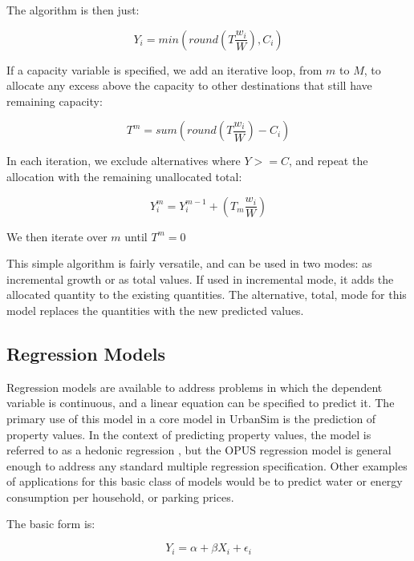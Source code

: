 The algorithm is then just:

\begin{equation}
Y_i = min(round(T\frac{w_i}{W}),C_i)
\end{equation}

If a capacity variable is specified, we add an iterative loop, from $m$ to $M$, to allocate any excess above the capacity to other destinations that still have remaining capacity:

\begin{equation}
T^m = sum(round(T\frac{w_i}{W}) - C_i)
\end{equation}

In each iteration, we exclude alternatives where $Y>=C$, and repeat the allocation with the remaining unallocated total:

\begin{equation}
Y^m_i = Y^{m-1}_i + (T_m\frac{w_i}{W})
\end{equation}

We then iterate over $m$ until $T^m = 0$ 

This simple algorithm is fairly versatile, and can be used in two modes: as incremental growth or as total values. If used in incremental mode, it adds the allocated quantity to the existing quantities.  The alternative, total, mode for this model replaces the quantities with the new predicted values.

\subsection{Regression Models}

Regression models are available to address problems in which the dependent variable is continuous, and a linear equation can be specified to predict it.  The primary use of this model in a core model in UrbanSim is the prediction of property values.  In the context of predicting property values, the model is referred to as a hedonic regression \cite{waddell-hedonic-1993}, but the OPUS regression model is general enough to address any standard multiple regression specification.  Other examples of applications for this basic class of models would be to predict water or energy consumption per household, or parking prices.

The basic form is:

\begin{equation}
Y_i = \alpha + \beta X_i + \epsilon_i
\end{equation}

